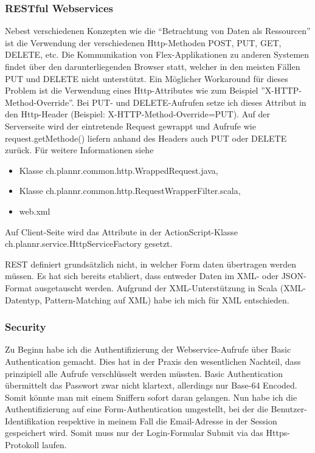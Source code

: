 \subsubsection{RESTful Webservices}\label{implementation:restful-webservices}
Nebest verschiedenen Konzepten wie die ``Betrachtung von Daten als Ressourcen'' ist die Verwendung der verschiedenen Http-Methoden POST, PUT, GET, DELETE, etc. 
Die Kommunikation von Flex-Applikationen zu anderen Systemen findet \"uber den darunterliegenden Browser statt, welcher in den meisten F\"allen PUT und DELETE nicht unterst\"utzt. Ein M\"oglicher Workaround f\"ur dieses Problem ist die Verwendung eines Http-Attributes wie zum Beispiel ''X-HTTP-Method-Override''. Bei PUT- und DELETE-Aufrufen setze ich dieses Attribut in den Http-Header (Beispiel: X-HTTP-Method-Override=PUT). Auf der Serverseite wird der eintretende Request gewrappt und Aufrufe wie request.getMethode() liefern anhand des Headers auch PUT oder DELETE zur\"uck. F\"ur weitere Informationen siehe
\begin{itemize}
\item Klasse ch.plannr.common.http.WrappedRequest.java,
\item Klasse ch.plannr.common.http.RequestWrapperFilter.scala,
\item web.xml
\end{itemize}
Auf Client-Seite wird das Attribute in der ActionScript-Klasse ch.plannr.service.HttpServiceFactory gesetzt. 

REST definiert grunds\"atzlich nicht, in welcher Form daten \"ubertragen werden m\"ussen. Es hat sich bereits etabliert, dass entweder Daten im XML- oder JSON-Format ausgetauscht werden. Aufgrund der XML-Unterst\"utzung in Scala (XML-Datentyp, Pattern-Matching auf XML) habe ich mich f\"ur XML entschieden.

\subsubsection{Security}\label{flex:security}
Zu Beginn habe ich die Authentifizierung der Webservice-Aufrufe \"uber Basic Authentication gemacht. Dies hat in der Praxis den wesentlichen Nachteil, dass prinzipiell alle Aufrufe verschl\"usselt werden m\"ussten. Basic Authentication \"ubermittelt das Passwort zwar nicht klartext, allerdings nur Base-64 Encoded. Somit k\"onnte man mit einem Sniffern sofort daran gelangen.
Nun habe ich die Authentifizierung auf eine Form-Authentication umgestellt, bei der die Benutzer-Identifikation respektive in meinem Fall die Email-Adresse in der Session gespeichert wird. Somit muss nur der Login-Formular Submit via das Https-Protokoll laufen.



